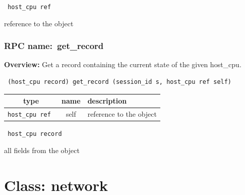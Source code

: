 \vspace{0.3cm}

{\tt 
host\_cpu ref
}


reference to the object
\vspace{0.3cm}
\vspace{0.3cm}
\vspace{0.3cm}
\subsubsection{RPC name:~get\_record}

{\bf Overview:} 
Get a record containing the current state of the given host\_cpu.

\begin{verbatim} (host_cpu record) get_record (session_id s, host_cpu ref self)\end{verbatim}



 
\vspace{0.3cm}
\begin{tabular}{|c|c|p{7cm}|}
 \hline
{\bf type} & {\bf name} & {\bf description} \\ \hline
{\tt host\_cpu ref } & self & reference to the object \\ \hline 

\end{tabular}

\vspace{0.3cm}

{\tt 
host\_cpu record
}


all fields from the object
\vspace{0.3cm}
\vspace{0.3cm}
\vspace{0.3cm}

\vspace{1cm}
\newpage
\section{Class: network}
